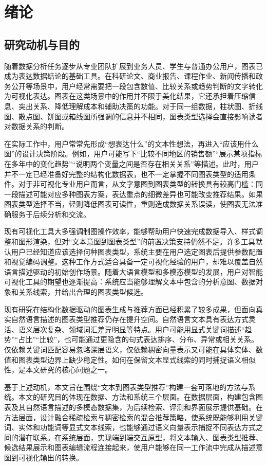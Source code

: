 \section{绪论}


\subsection{研究动机与目的}
随着数据分析任务逐步从专业团队扩展到业务人员、学生与普通办公用户，图表已成为表达数据结论的基础工具。在科研论文、商业报告、课程作业、新闻传播和政务公开等场景中，用户经常需要把一段包含数值、比较关系或趋势判断的文字转化为可视化表达。图表在这类场景中的作用并不限于美化结果，它还承担着压缩信息、突出关系、降低理解成本和辅助决策的功能。对于同一组数据，柱状图、折线图、散点图、饼图或箱线图所强调的信息并不相同，图表类型选择会直接影响读者对数据关系的判断。

在实际工作中，用户常常先形成“想表达什么”的文本性想法，再进入“应该用什么图”的设计决策阶段。例如，用户可能写下“比较不同地区的销售额”“展示某项指标在多年中的变化趋势”“说明两个变量之间是否存在相关关系”等描述。此时，用户并不一定已经准备好完整的结构化数据表，也不一定掌握不同图表类型的适用条件。对于非可视化专业用户而言，从文字意图到图表类型的转换具有较高门槛：同一段描述可能对应多种图表方案，表达重点的细微差异也可能改变推荐结果。如果图表类型选择不当，轻则降低图表可读性，重则造成数据关系误读，使图表无法准确服务于后续分析和交流。

现有可视化工具大多强调制图操作效率，能够帮助用户快速完成数据导入、样式调整和图形渲染，但对“文本意图到图表类型”的前置决策支持仍然不足。许多工具默认用户已经知道应该选择何种图表类型，系统主要在用户选定图表后提供参数配置和视觉编码调整。这种工作方式适合具备一定可视化经验的用户，却难以覆盖自然语言描述驱动的初始创作场景。随着大语言模型和多模态模型的发展，用户对智能可视化工具的期望也逐渐提高：系统应当能够理解文本中包含的分析意图、数据对象和关系线索，并给出合理的图表类型候选。

现有研究在结构化数据驱动的图表生成与推荐方面已经积累了较多成果，但面向真实自然语言描述的图表类型推荐仍存在提升空间。自然语言文本具有表达方式灵活、语义层次复杂、领域词汇差异明显等特点。用户可能用显式关键词描述“趋势”“占比”“比较”，也可能通过更隐含的句式表达排序、分布、异常或相关关系。仅依赖关键词匹配容易忽略深层语义，仅依赖稠密向量表示又可能在具体实体、数值和图表类型边界上缺少稳定性。如何在保留文本显式线索的同时捕捉语义相似性，是本文研究的核心问题之一。

基于上述动机，本文旨在围绕“文本到图表类型推荐”构建一套可落地的方法与系统。本文的研究目的体现在数据、方法和系统三个层面。在数据层面，构建包含图表及其自然语言描述的多模态数据集，为后续检索、评测和界面展示提供基础。在方法层面，设计融合稀疏检索与稠密检索的混合推荐策略，使系统既能够利用关键词、实体和功能词等显式文本线索，也能够通过语义向量表示捕捉不同表达方式之间的潜在联系。在系统层面，实现端到端交互原型，将文本输入、图表类型推荐、候选结果展示和图表编辑流程连接起来，使用户能够在同一工作流中完成从描述意图到可视化输出的转换。

